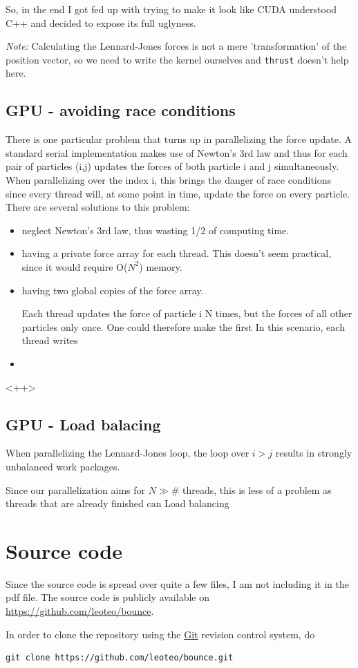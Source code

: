 \documentclass{scrartcl}
\begin{document}
So, in the end I got fed up with trying to make it look like CUDA understood C++
and decided to expose its full uglyness. 

\emph{Note:} 
Calculating the Lennard-Jones forces is not a mere 'transformation' of
the position vector, so we need to write the kernel ourselves
and \verb|thrust| doesn't help here.


\subsection{GPU - avoiding race conditions}


There is one particular problem that turns up in parallelizing
the force update. 
A standard serial implementation makes use of Newton's 3rd law
and thus for each pair of particles (i,j) updates the forces of both
particle i and j simultaneously.
When parallelizing over the index i,
this brings the danger of race conditions 
since every thread will, at some point in time, 
update the force on every particle.
There are several solutions to this problem:
\begin{itemize}
    \item neglect Newton's 3rd law, thus wasting 1/2 of computing time.
    \item having a private force array for each thread. 
        This doesn't seem practical, since it would require O($N^2$) memory.
    \item having two global copies of the force array.

        Each thread updates the force of particle i N times, but the forces of
        all other particles only once. One could therefore make the first
        In this scenario, each thread writes
    \item 
\end{itemize}<++>

\subsection{GPU - Load balacing}
When parallelizing the Lennard-Jones loop,
the loop over $i>j$ results in strongly unbalanced work packages.

Since our parallelization aims for $N\gg \#$ threads,
this is less of a problem as threads that are already finished
can 
Load balancing




\section{Source code}

Since the source code is spread over quite a few files,
I am not including it in the pdf file.
The source code is publicly available on
\url{https://github.com/leoteo/bounce}.

In order to clone the repository using the \href{http://git-scm.com}{Git} 
revision control system, do

\begin{verbatim}
git clone https://github.com/leoteo/bounce.git
\end{verbatim}
\end{document}
